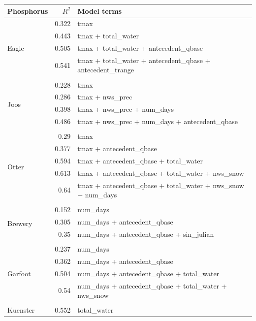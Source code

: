 \documentclass[10pt]{article}
\begin{document}
\begin{table}[h] \small
    \begin{center}
    \begin{tabular}{lrl}
    \textbf{Phosphorus} & $R^2$ & Model terms \\
    \hline
\multirow{5}{*}{Eagle} & 0.322 & tmax\\ 
 & 0.443 & tmax + total\_water\\ 
 & 0.505 & tmax + total\_water + antecedent\_qbase\\ 
 & 0.541 & tmax + total\_water + antecedent\_qbase + antecedent\_trange\\ 
\vspace{2mm}\\ \multirow{5}{*}{Joos} & 0.228 & tmax\\ 
 & 0.286 & tmax + nws\_prec\\ 
 & 0.398 & tmax + nws\_prec + num\_days\\ 
 & 0.486 & tmax + nws\_prec + num\_days + antecedent\_qbase\\ 
\vspace{2mm}\\ \multirow{6}{*}{Otter} & 0.29 & tmax\\ 
 & 0.377 & tmax + antecedent\_qbase\\ 
 & 0.594 & tmax + antecedent\_qbase + total\_water\\ 
 & 0.613 & tmax + antecedent\_qbase + total\_water + nws\_snow\\ 
 & 0.64 & tmax + antecedent\_qbase + total\_water + nws\_snow + num\_days\\ 
\vspace{2mm}\\ \multirow{4}{*}{Brewery} & 0.152 & num\_days\\ 
 & 0.305 & num\_days + antecedent\_qbase\\ 
 & 0.35 & num\_days + antecedent\_qbase + sin\_julian\\ 
\vspace{2mm}\\ \multirow{5}{*}{Garfoot} & 0.237 & num\_days\\ 
 & 0.362 & num\_days + antecedent\_qbase\\ 
 & 0.504 & num\_days + antecedent\_qbase + total\_water\\ 
 & 0.54 & num\_days + antecedent\_qbase + total\_water + nws\_snow\\ 
\vspace{2mm}\\ \multirow{3}{*}{Kuenster} & 0.552 & total\_water\\ 

\end{tabular}
\end{center}
\end{table}
\end{document}
